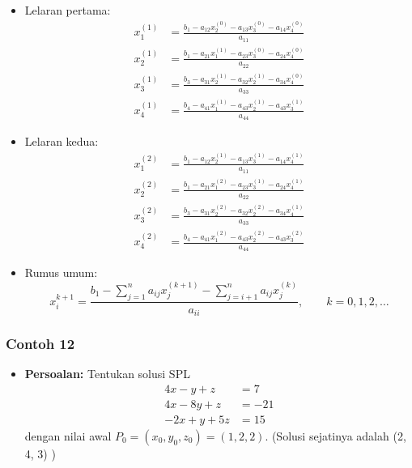 \documentclass[pdflatex,compress,mathserif]{beamer}
\begin{document}
\begin{frame}
	\begin{itemize}
		\item Lelaran pertama:
		\begin{align*}
		x_1^{(1)} &= \frac{b_1 - a_{12}x_2^{(0)} - a_{13}x_3^{(0)} - a_{14}x_4^{(0)}}{a_{11}}\\
		x_2^{(1)} &= \frac{b_1 - a_{21}x_1^{(1)} - a_{23}x_3^{(0)} - a_{24}x_4^{(0)}}{a_{22}}\\
		x_3^{(1)} &= \frac{b_3 - a_{31}x_2^{(1)} - a_{32}x_2^{(1)} - a_{34}x_4^{(0)}}{a_{33}}\\
		x_4^{(1)} &= \frac{b_4 - a_{41}x_1^{(1)} - a_{43}x_2^{(1)} - a_{43}x_3^{(1)}}{a_{44}}
		\end{align*}
	\end{itemize}
\end{frame}

\begin{frame}
	\begin{itemize}
		\item Lelaran kedua:
		\begin{align*}
		x_1^{(2)} &= \frac{b_1 - a_{12}x_2^{(1)} - a_{13}x_3^{(1)} - a_{14}x_4^{(1)}}{a_{11}}\\
		x_2^{(2)} &= \frac{b_1 - a_{21}x_1^{(2)} - a_{23}x_3^{(1)} - a_{24}x_4^{(1)}}{a_{22}}\\
		x_3^{(2)} &= \frac{b_3 - a_{31}x_2^{(2)} - a_{32}x_2^{(2)} - a_{34}x_4^{(1)}}{a_{33}}\\
		x_4^{(2)} &= \frac{b_4 - a_{41}x_1^{(2)} - a_{43}x_2^{(2)} - a_{43}x_3^{(2)}}{a_{44}}
		\end{align*}
	\end{itemize}
\end{frame}

\begin{frame}
	\begin{itemize}
		\item Rumus umum:
		\[ x_i^{k+1} = \frac{b_1 - \sum\limits_{j=1}^{n}a_{ij}x_j^{(k+1)}-\sum\limits_{j=i+1}^{n}a_{ij}x_j^{(k)}}{a_{ii}},\qquad k=0,1,2,\dots \]
	\end{itemize}
\end{frame}

\begin{frame}
	\frametitle{Contoh 12}
	\begin{itemize}
		\item \textbf{Persoalan:} Tentukan solusi SPL
		\begin{align*}
			4x - y + z &= 7 \\
			4x - 8y + z &= -21 \\
			-2x + y + 5z &= 15
		\end{align*}
		dengan nilai awal $ P_0 = (x_0 , y_0 , z_0) = (1, 2, 2) $. (Solusi sejatinya adalah (2, 4, 3) )
	\end{itemize}
\end{frame}
\end{document}
